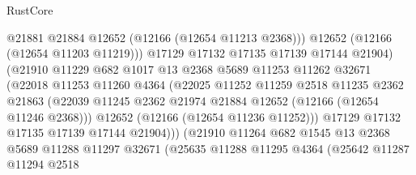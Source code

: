 \begin{lexlean}{RustCore}
\begin{coremodule}
                                  @21881
                                  @21884
                                  @12652
                                  (@12166 (@12654 @11213 @2368)))
                                @12652
                                (@12166 (@12654 @11203 @11219)))
                              @17129
                              @17132
                              @17135
                              @17139
                              @17144
                              @21904)
                            (@21910
                              @11229
                              @682
                              @1017
                              @13
                              @2368
                              @5689
                              @11253
                              @11262
                              @32671
                              (@22018
                                @11253
                                @11260
                                @4364
                                (@22025
                                  @11252
                                  @11259
                                  @2518
                                  @11235
                                  @2362
                                  @21863
                                  (@22039
                                    @11245
                                    @2362
                                    @21974
                                    @21884
                                    @12652
                                    (@12166 (@12654 @11246 @2368)))
                                  @12652
                                  (@12166 (@12654 @11236 @11252)))
                                @17129
                                @17132
                                @17135
                                @17139
                                @17144
                                @21904)))
                          (@21910
                            @11264
                            @682
                            @1545
                            @13
                            @2368
                            @5689
                            @11288
                            @11297
                            @32671
                            (@25635
                              @11288
                              @11295
                              @4364
                              (@25642
                                @11287
                                @11294
                                @2518

\end{coremodule}
\end{lexlean}
